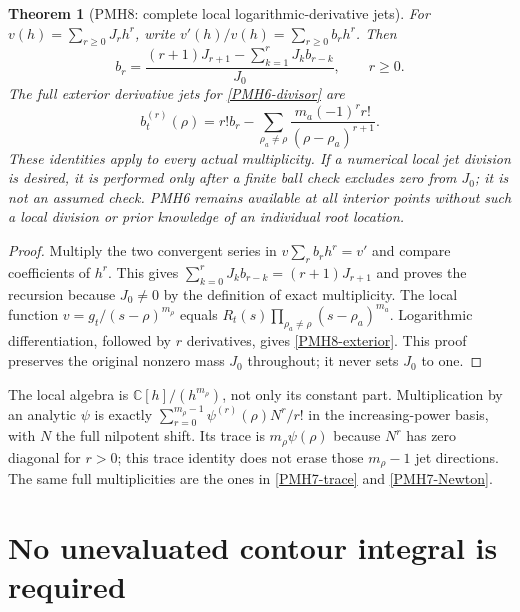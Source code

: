 \documentclass[11pt]{article}
\newtheorem{theorem}{Theorem}
\newcommand{\C}{\mathbb C}
\begin{document}
\begin{theorem}[PMH8: complete local logarithmic-derivative jets]
\label{PMH8}
For $v(h)=\sum_{r\ge0}J_rh^r$, write
$v'(h)/v(h)=\sum_{r\ge0}b_rh^r$. Then
\begin{equation}\label{PMH8-recursion}
 b_r=\frac{(r+1)J_{r+1}-\sum_{k=1}^rJ_kb_{r-k}}{J_0},
 \qquad r\ge0.
\end{equation}
The full exterior derivative jets for \eqref{PMH6-divisor} are
\begin{equation}\label{PMH8-exterior}
 b_t^{(r)}(\rho)=r!b_r
       -\sum_{\rho_a\ne\rho}
          \frac{m_a(-1)^r r!}{(\rho-\rho_a)^{r+1}}.
\end{equation}
These identities apply to every actual multiplicity. If a numerical
local jet division is desired, it is performed only after a finite
ball check excludes zero from $J_0$; it is not an assumed check.
PMH6 remains available at all interior points without such a
local division or prior knowledge of an individual root location.
\end{theorem}
\begin{proof}
Multiply the two convergent series in $v\sum_rb_rh^r=v'$ and
compare coefficients of $h^r$. This gives
$\sum_{k=0}^rJ_kb_{r-k}=(r+1)J_{r+1}$ and proves the recursion
because $J_0\ne0$ by the definition of exact multiplicity.
The local function $v=g_t/(s-\rho)^{m_\rho}$ equals
$R_t(s)\prod_{\rho_a\ne\rho}(s-\rho_a)^{m_a}$.
Logarithmic differentiation, followed by $r$ derivatives, gives
\eqref{PMH8-exterior}. This proof preserves the original nonzero
mass $J_0$ throughout; it never sets $J_0$ to one.
\end{proof}

The local algebra is $\C[h]/(h^{m_\rho})$, not only its constant
part. Multiplication by an analytic $\psi$ is exactly
$\sum_{r=0}^{m_\rho-1}\psi^{(r)}(\rho)N^r/r!$ in the
increasing-power basis, with $N$ the full nilpotent shift. Its trace
is $m_\rho\psi(\rho)$ because $N^r$ has zero diagonal for $r>0$;
this trace identity does not erase those $m_\rho-1$ jet directions.
The same full multiplicities are the ones in
\eqref{PMH7-trace} and \eqref{PMH7-Newton}.

\section{No unevaluated contour integral is required}
\end{document}
